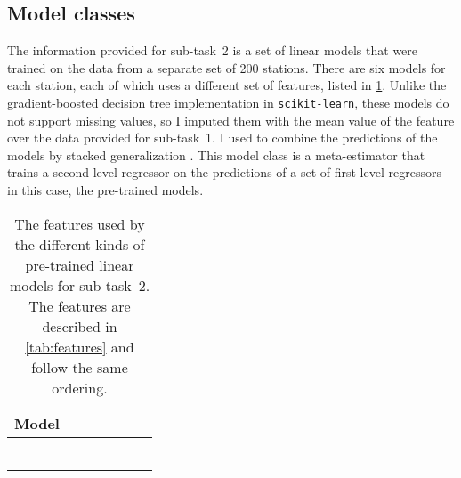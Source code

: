 \documentclass[11pt]{extarticle}
\begin{document}
\subsection{Model classes}
\label{sec:st2:model-classes}

The information provided for sub-task~2 is a set of linear models that were trained on
the data from a separate set of 200 stations.
There are six models for each station, each of which uses a different set of features,
listed in \cref{tab:st2:features-rlm}.
Unlike the gradient-boosted decision tree implementation in \texttt{scikit-learn},
these models do not support missing values, so I imputed them with the mean value of
the feature over the data provided for sub-task~1.
I used  to combine the predictions of the models
by stacked generalization \parencite{Wolpert1992}.
This model class is a meta-estimator that trains a second-level regressor on the
predictions of a set of first-level regressors -- in this case, the pre-trained models.

\begin{table}
  \centering
  \newcommand{\rlmtablerow}[7]{#1 & #7 & #2 & #3 & #4 & #5 & #6 \\}
  \begin{tabular}{lllllll}

    \rlmtablerow{Model}{\coldiag{\bikesh{}}}{\coldiag{\bikesavgfull{}}}{\coldiag{\bikesavgshort{}}}{\coldiag{\bikeshdiffavgfull{}}}{\coldiag{\bikeshdiffavgshort{}}}{\coldiag{\texttt{temperature}}}

    \midrule

    \rlmtablerow{\rlmfull{}}{\checkmark}{\checkmark}{}{\checkmark}{}{}

    \rlmtablerow{\rlmfulltemp{}}{\checkmark}{\checkmark}{}{\checkmark}{}{\checkmark}

    \rlmtablerow{\rlmshort{}}{\checkmark}{}{\checkmark}{}{\checkmark}{}

    \rlmtablerow{\rlmshortfull{}}{\checkmark}{\checkmark}{\checkmark}{\checkmark}{\checkmark}{}

    \rlmtablerow{\rlmshortfulltemp{}}{\checkmark}{\checkmark}{\checkmark}{\checkmark}{\checkmark}{\checkmark}

    \rlmtablerow{\rlmshorttemp{}}{\checkmark}{}{\checkmark}{}{\checkmark}{\checkmark}

    \bottomrule
  \end{tabular}
  \caption{The features used by the different kinds of pre-trained linear
    models for sub-task~2.
    The features are described in \cref{tab:features} and follow the same ordering.
  }
  \label{tab:st2:features-rlm}
\end{table}
\end{document}
